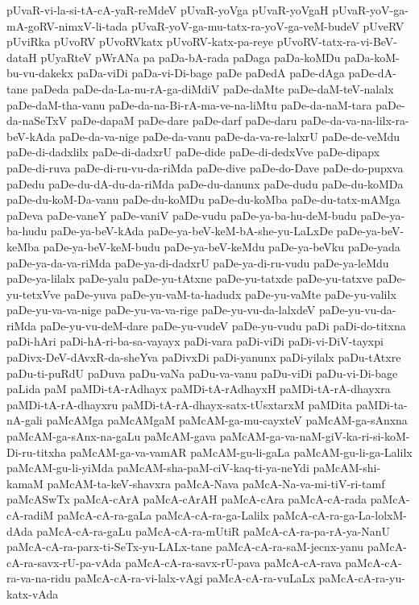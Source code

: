 {pUvaR-vi-la-si-tA-cA-yaR-reMdeV
pUvaR-yoVga
pUvaR-yoVgaH
pUvaR-yoV-ga-mA-goRV-nimxV-li-tada
pUvaR-yoV-ga-mu-tatx-ra-yoV-ga-veM-budeV
pUveRV
pUviRka
pUvoRV
pUvoRVkatx
pUvoRV-katx-pa-reye
pUvoRV-tatx-ra-vi-BeV-dataH
pUyaRteV
pWrANa
pa
paDa-bA-rada
paDaga
paDa-koMDu
paDa-koM-bu-vu-dakekx
paDa-viDi
paDa-vi-Di-bage
paDe
paDedA
paDe-dAga
paDe-dA-tane
paDeda
paDe-da-La-nu-rA-ga-diMdiV
paDe-daMte
paDe-daM-teV-nalalx
paDe-daM-tha-vanu
paDe-da-na-Bi-rA-ma-ve-na-liMtu
paDe-da-naM-tara
paDe-da-naSeTxV
paDe-dapaM
paDe-dare
paDe-darf
paDe-daru
paDe-da-va-na-lilx-ra-beV-kAda
paDe-da-va-nige
paDe-da-vanu
paDe-da-va-re-lalxrU
paDe-de-veMdu
paDe-di-dadxlilx
paDe-di-dadxrU
paDe-dide
paDe-di-dedxVve
paDe-dipapx
paDe-di-ruva
paDe-di-ru-vu-da-riMda
paDe-dive
paDe-do-Dave
paDe-do-pupxva
paDedu
paDe-du-dA-du-da-riMda
paDe-du-danunx
paDe-dudu
paDe-du-koMDa
paDe-du-koM-Da-vanu
paDe-du-koMDu
paDe-du-koMba
paDe-du-tatx-mAMga
paDeva
paDe-vaneY
paDe-vaniV
paDe-vudu
paDe-ya-ba-hu-deM-budu
paDe-ya-ba-hudu
paDe-ya-beV-kAda
paDe-ya-beV-keM-bA-she-yu-LaLxDe
paDe-ya-beV-keMba
paDe-ya-beV-keM-budu
paDe-ya-beV-keMdu
paDe-ya-beVku
paDe-yada
paDe-ya-da-va-riMda
paDe-ya-di-dadxrU
paDe-ya-di-ru-vudu
paDe-ya-leMdu
paDe-ya-lilalx
paDe-yalu
paDe-yu-tAtxne
paDe-yu-tatxde
paDe-yu-tatxve
paDe-yu-tetxVve
paDe-yuva
paDe-yu-vaM-ta-hadudx
paDe-yu-vaMte
paDe-yu-valilx
paDe-yu-va-va-nige
paDe-yu-va-va-rige
paDe-yu-vu-da-lalxdeV
paDe-yu-vu-da-riMda
paDe-yu-vu-deM-dare
paDe-yu-vudeV
paDe-yu-vudu
paDi
paDi-do-titxna
paDi-hAri
paDi-hA-ri-ba-sa-vayayx
paDi-vara
paDi-viDi
paDi-vi-DiV-tayxpi
paDivx-DeV-dAvxR-da-sheYva
paDivxDi
paDi-yanunx
paDi-yilalx
paDu-tAtxre
paDu-ti-puRdU
paDuva
paDu-vaNa
paDu-va-vanu
paDu-viDi
paDu-vi-Di-bage
paLida
paM
paMDi-tA-rAdhayx
paMDi-tA-rAdhayxH
paMDi-tA-rA-dhayxra
paMDi-tA-rA-dhayxru
paMDi-tA-rA-dhayx-satx-tUsxtarxM
paMDita
paMDi-ta-nA-gali
paMcAMga
paMcAMgaM
paMcAM-ga-mu-cayxteV
paMcAM-ga-sAnxna
paMcAM-ga-sAnx-na-gaLu
paMcAM-gava
paMcAM-ga-va-naM-giV-ka-ri-si-koM-Di-ru-titxha
paMcAM-ga-va-vamAR
paMcAM-gu-li-gaLa
paMcAM-gu-li-ga-Lalilx
paMcAM-gu-li-yiMda
paMcAM-sha-paM-ciV-kaq-ti-ya-neYdi
paMcAM-shi-kamaM
paMcAM-ta-keV-shavxra
paMcA-Nava
paMcA-Na-va-mi-tiV-ri-tamf
paMcASwTx
paMcA-cArA
paMcA-cArAH
paMcA-cAra
paMcA-cA-rada
paMcA-cA-radiM
paMcA-cA-ra-gaLa
paMcA-cA-ra-ga-Lalilx
paMcA-cA-ra-ga-La-lolxM-dAda
paMcA-cA-ra-gaLu
paMcA-cA-ra-mUtiR
paMcA-cA-ra-pa-rA-ya-NanU
paMcA-cA-ra-parx-ti-SeTx-yu-LALx-tane
paMcA-cA-ra-saM-jecnx-yanu
paMcA-cA-ra-savx-rU-pa-vAda
paMcA-cA-ra-savx-rU-pava
paMcA-cA-rava
paMcA-cA-ra-va-na-ridu
paMcA-cA-ra-vi-lalx-vAgi
paMcA-cA-ra-vuLaLx
paMcA-cA-ra-yu-katx-vAda
}
